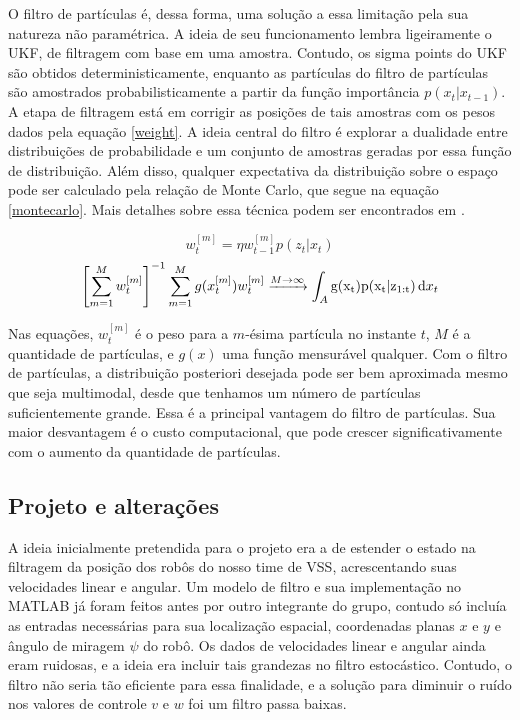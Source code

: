 \documentclass[paper=a4, fontsize=11pt]{scrartcl}
\begin{document}
O filtro de partículas é, dessa forma, uma solução a essa limitação pela sua natureza não paramétrica. A ideia de seu funcionamento lembra ligeiramente o UKF, de filtragem com base em uma amostra. Contudo, os sigma points do UKF são obtidos deterministicamente, enquanto as partículas do filtro de partículas são amostrados probabilisticamente a partir da função importância $p(x_t |x_{t-1})$. A etapa de filtragem está em corrigir as posições de tais amostras com os pesos dados pela equação \eqref{weight}. A ideia central do filtro é explorar a dualidade entre distribuições de probabilidade e um conjunto de amostras geradas por essa função de distribuição. Além disso, qualquer expectativa da distribuição sobre o espaço pode ser calculado pela relação de Monte Carlo, que segue na equação \eqref{montecarlo}. Mais detalhes sobre essa técnica podem ser encontrados em \cite{monte_carlo_localization}.

\begin{equation}
\label{weight}
w_t^{[m]} = \eta w_{t-1}^{[m]}p(z_t|x_t)
\end{equation}
\begin{equation}
\label{montecarlo}
\small{
\left[\displaystyle\sum_{m=1}^{M} w_t^{[m]}\right]^{-1} \displaystyle\sum_{m=1}^{M} {g(x_t^{[m]})w_t^{[m]}} \xrightarrow[]{M \rightarrow \infty} \int_A \mathrm{g(x_t)p(x_t|z_{1:t})}\,\mathrm{d}x_t}
\end{equation}

Nas equações, $w_t^{[m]}$  é o peso para a $m$-ésima partícula no instante $t$, $M$ é a quantidade de partículas, e $g(x)$ uma função mensurável qualquer. Com o filtro de partículas, a distribuição posteriori desejada pode ser bem aproximada mesmo que seja multimodal, desde que tenhamos um número de partículas suficientemente grande. Essa é a principal vantagem do filtro de partículas. Sua maior desvantagem é o custo computacional, que pode crescer significativamente com o aumento da quantidade de partículas.

\subsection{Projeto e alterações}

A ideia inicialmente pretendida para o projeto era a de estender o estado na filtragem da posição dos robôs do nosso time de VSS, acrescentando suas velocidades linear e angular. Um modelo de filtro e sua implementação no MATLAB já foram feitos antes por outro integrante do grupo, contudo só incluía as entradas necessárias para sua localização espacial, coordenadas planas $x$ e $y$ e ângulo de miragem $\psi$ do robô. Os dados de velocidades linear e angular ainda eram ruidosas, e a ideia era incluir tais grandezas no filtro estocástico. Contudo, o filtro não seria tão eficiente para essa finalidade, e a solução para diminuir o ruído nos valores de controle $v$ e $w$ foi um filtro passa baixas.
\end{document}
